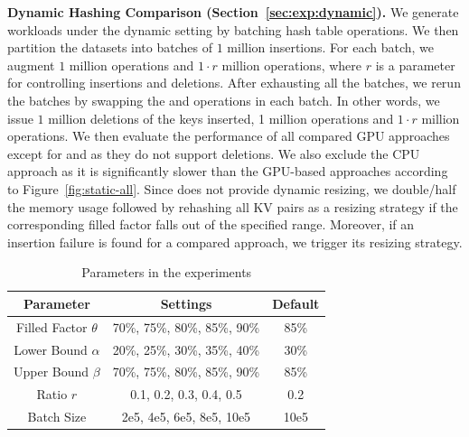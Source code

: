 

\vspace{1mm}\noindent\textbf{Dynamic Hashing Comparison (Section~\ref{sec:exp:dynamic}).}
We generate workloads under the dynamic setting by batching hash table operations.
We then partition the datasets into batches of $1$ million insertions. 
For each batch, we augment $1$ million  operations and $1 \cdot r$ million  operations,
where $r$ is a parameter for controlling insertions and deletions.
After exhausting all the batches, we rerun the batches by swapping the  and  operations in each batch. 
In other words, we issue $1$ million deletions of the keys inserted, 1 million  operations and $1 \cdot r$ million  operations.
We then evaluate the performance of all compared GPU approaches except for \cudpp and \warp as they do not support deletions. 
We also exclude the CPU approach as it is significantly slower than the GPU-based approaches according to Figure~\ref{fig:static-all}. 
Since \megakv does not provide dynamic resizing, we double/half the memory usage followed by rehashing all KV pairs as a resizing strategy if the corresponding filled factor falls out of the specified range. 
Moreover, if an insertion failure is found for a compared approach, we trigger its resizing strategy.

\begin{table}[t]
	\centering
	\caption{Parameters in the experiments}
	\vspace{-1.5em}
	\label{tbl:parameters}
	\begin{tabular}{|c|c|c|}
		\hline
		\textbf{Parameter} & \textbf{Settings} & \textbf{Default} \\ \hline
		Filled Factor	$\theta$  & 70\%, 75\%, 80\%, 85\%, 90\% & 85\% \\ \hline
		Lower Bound $\alpha$ & 20\%, 25\%, 30\%, 35\%, 40\% & 30\% \\ \hline
		Upper Bound	$\beta$  & 70\%, 75\%, 80\%, 85\%, 90\% & 85\% \\ \hline
		Ratio $r$ & 0.1, 0.2, 0.3, 0.4, 0.5 & 0.2 \\ \hline
		Batch Size & 2e5, 4e5, 6e5, 8e5, 10e5 & 10e5 \\ \hline
	\end{tabular}
\end{table}

